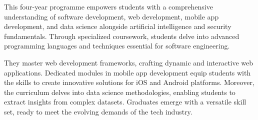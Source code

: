 

\enlargethispage{11cm}

\vspace{-1.75cm}
\begin{minipage}{.3\textwidth}\flushleft
This four-year programme empowers students with a comprehensive understanding of software development, web development, mobile app development, and data science alongside artificial intelligence and security fundamentals. Through specialized coursework, students delve into advanced programming languages and techniques essential for software engineering. 

\vspace{0.3cm}
They master web development frameworks, crafting dynamic and interactive web applications. 
Dedicated modules in mobile app development equip students with the skills to create innovative solutions for iOS and Android platforms. 
Moreover, the curriculum delves into data science methodologies, enabling students to extract insights from complex datasets. Graduates emerge with a versatile skill set, ready to meet the evolving demands of the tech industry.

%
%

\end{minipage}
%
\hfill
%
